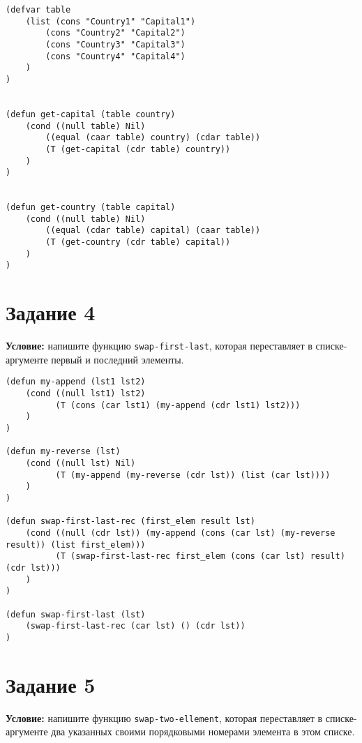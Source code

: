 \begin{lstlisting}
(defvar table 
    (list (cons "Country1" "Capital1")
        (cons "Country2" "Capital2")
        (cons "Country3" "Capital3")
        (cons "Country4" "Capital4")
    )
)


(defun get-capital (table country)
    (cond ((null table) Nil)
        ((equal (caar table) country) (cdar table))
        (T (get-capital (cdr table) country))
    )
)


(defun get-country (table capital)
    (cond ((null table) Nil)
        ((equal (cdar table) capital) (caar table))
        (T (get-country (cdr table) capital))
    )
)
\end{lstlisting}




\section{Задание 4}

\textbf{Условие:} напишите функцию \texttt{swap-first-last}, которая переставляет в списке-аргументе первый и последний элементы.

\begin{lstlisting}
(defun my-append (lst1 lst2)
    (cond ((null lst1) lst2)
          (T (cons (car lst1) (my-append (cdr lst1) lst2)))
    )
)

(defun my-reverse (lst)
    (cond ((null lst) Nil)
          (T (my-append (my-reverse (cdr lst)) (list (car lst))))
    )
)

(defun swap-first-last-rec (first_elem result lst)
    (cond ((null (cdr lst)) (my-append (cons (car lst) (my-reverse result)) (list first_elem)))
          (T (swap-first-last-rec first_elem (cons (car lst) result) (cdr lst)))
    )
)

(defun swap-first-last (lst)
    (swap-first-last-rec (car lst) () (cdr lst))
)    
\end{lstlisting}


\section{Задание 5}

\textbf{Условие:} напишите функцию \texttt{swap-two-ellement}, которая переставляет в списке-аргументе два указанных своими порядковыми номерами элемента в этом списке.



